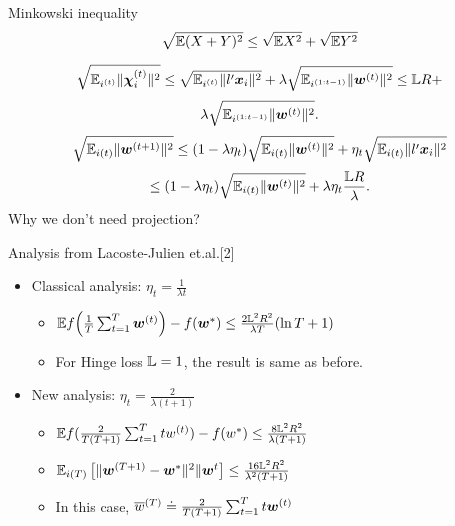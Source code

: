 \begin{frame}
    \begin{block}{ Minkowski inequality}
    \[
        \sqrt{\mathbb{E}(X+Y)^2} \le \sqrt{\mathbb{E} X^2} + \sqrt{\mathbb{E} Y^2}
    \]
    \end{block}
    \[
        \sqrt{\mathbb{E}_{i^{(t)}} \|\bm{\chi}_i^{(t)}\|^2} \le \sqrt{\mathbb{E}_{i^{(t)}} \| l'\bm{x}_i \|^2} + \lambda           \sqrt{\mathbb{E}_{i^{(1:t-1)}} \| \bm{w}^{(t)} \|^2} \le \mathbb{L} R + 
    \] 
    \[
        \lambda \sqrt{\mathbb{E}_{i^{(1:t-1)}} \| \bm{w}^{(t)}          \|^2}.
    \]
    \[
        \sqrt{\mathbb{E}_{i(t)} \|\bm{w}^{(t+1)}\|^2} \le (1-\lambda \eta_t) \sqrt{\mathbb{E}_{i(t)} \|\bm{w}^{(t)}\|^2} +        \eta_t \sqrt{\mathbb{E}_{i(t)} \|l'\bm{x}_i\|^2} 
    \]
    \[
        \le (1-\lambda \eta_t)\sqrt{\mathbb{E}_{i(t)} \| \bm{w}^{(t)}\|^2} +         \lambda \eta_t \frac{\mathbb{L} R}{\lambda}.
    \]
    {\color{blue} Why we don't need projection?}
\end{frame}

\begin{frame}{Analysis from Lacoste-Julien et.al.[2]}
    \begin{itemize} 
        \item Classical analysis: $\eta_t=\frac{1}{\lambda t}$
            \begin{itemize}
                \item $\mathbb{E} f\!\left(\frac1T\sum_{t=1}^T \bm{w}^{(t)} \right)- f(\bm{w}^*) \le \frac{2{\mathbb{L}}^2 R^2}{\lambda T}(\ln{T}+1)$
                \item For Hinge loss $\mathbb{L} = 1$, the result is same as before.
            \end{itemize}
        \item New analysis: $\eta_t=\frac{2}{\lambda (t+1)}$
            \begin{itemize}
                \item $\mathbb{E} f(\frac{2}{T(T+1)}\sum_{t=1}^{T}t w^{(t)}) - f(w^*) \le \frac{8{\mathbb{L}}^2 R^2}{\lambda (T+1)}$
                \item $\mathbb{E}_{i(T)} \left[  \|\bm{w}^{(T+1)} - \bm{w}^*\|^2  \|  \bm{w}^t  \right]  \le \frac{16{\mathbb{L}}^2 R^2}{\lambda^2 (T+1)}$
                \item In this case, $\overline{w}^{(T)}\doteq \frac{2}{T(T+1)}\sum_{t=1}^T t\bm{w}^{(t)}$
            \end{itemize}
    \end{itemize}
    
\end{frame}

